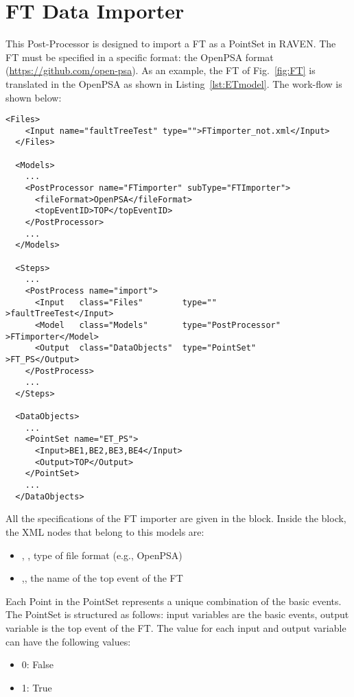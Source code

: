 \section{FT Data Importer}
\label{sec:FTdataImporter}

This Post-Processor is designed to import a FT as a PointSet in RAVEN.
The FT must be specified in a specific format: the OpenPSA format (\href{<url>}{https://github.com/open-psa}). 
As an example, the FT of Fig.~\ref{fig:FT} is translated in the OpenPSA as shown in Listing~\ref{lst:ETmodel}.
The work-flow is shown below:

\begin{lstlisting}[style=XML,morekeywords={anAttribute},caption=FT Importer input example., label=lst:FT_PP_InputExample]
  <Files>
    <Input name="faultTreeTest" type="">FTimporter_not.xml</Input>
  </Files>
  
  <Models>
    ...
    <PostProcessor name="FTimporter" subType="FTImporter">
      <fileFormat>OpenPSA</fileFormat>
      <topEventID>TOP</topEventID>
    </PostProcessor> 
    ...  
  </Models>

  <Steps>
    ...
    <PostProcess name="import">
      <Input   class="Files"        type=""                >faultTreeTest</Input>
      <Model   class="Models"       type="PostProcessor"   >FTimporter</Model>
      <Output  class="DataObjects"  type="PointSet"        >FT_PS</Output>
    </PostProcess>
    ...
  </Steps>

  <DataObjects>
    ...
    <PointSet name="ET_PS">
      <Input>BE1,BE2,BE3,BE4</Input>
      <Output>TOP</Output>
    </PointSet>
    ...
  </DataObjects>
\end{lstlisting}

All the specifications of the FT importer are given in the 
 block. 
Inside the  block, the XML
nodes that belong to this models are:
\begin{itemize}
  \item  {}, , type of file format (e.g., OpenPSA)
  \item  {},, the name of the top event of the FT
\end{itemize}

Each Point in the PointSet represents a unique combination of the basic events.
The PointSet is structured as follows: input variables are the basic events, output variable is the top event of the FT.
The value for each input and output variable can have the following values:
\begin{itemize}
  \item  0: False
  \item  1: True
\end{itemize}

